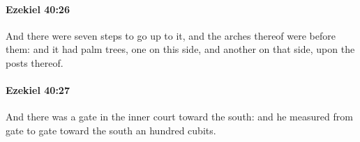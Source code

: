 		\paragraph{Ezekiel 40:26} %
			\label{EZEKIEL-40-26}

			And there were seven steps to go up to it, and the arches thereof were before them: and it had palm trees, one on this side, and another on that side, upon the posts thereof.


		\paragraph{Ezekiel 40:27} %
			\label{EZEKIEL-40-27}

			And there was a gate in the inner court toward the south: and he measured from gate to gate toward the south an hundred cubits.


